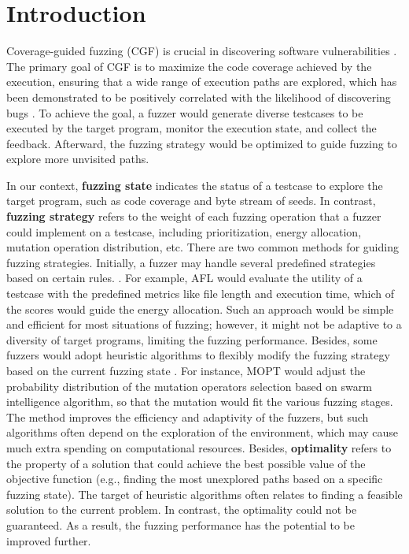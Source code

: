 \documentclass[lettersize,journal]{IEEEtran}
\begin{document}
\section{Introduction}

Coverage-guided fuzzing (CGF) is crucial in discovering software vulnerabilities \cite{zhuFuzzingSurveyRoadmap2022}. The primary goal of CGF is to maximize the code coverage achieved by the execution, ensuring that a wide range of execution paths are explored, which has been demonstrated to be positively correlated with the likelihood of discovering bugs \cite{bohmeReliabilityCoveragebasedFuzzer2022}. To achieve the goal, a fuzzer would generate diverse testcases to be executed by the target program, monitor the execution state, and collect the feedback. Afterward, the fuzzing strategy would be optimized to guide fuzzing to explore more unvisited paths.

In our context, \textbf{fuzzing state} indicates the status of a testcase to explore the target program, such as code coverage and byte stream of seeds. In contrast, \textbf{fuzzing strategy} refers to the weight of each fuzzing operation that a fuzzer could implement on a testcase, including prioritization, energy allocation, mutation operation distribution, etc. There are two common methods for guiding fuzzing strategies. Initially, a fuzzer may handle several predefined strategies based on certain rules. \cite{fioraldiAFLCombiningIncremental2020,zhuRegressionGreyboxFuzzing2021,chenNovelCoverageguidedGreybox2023}. For example, AFL \cite{AmericanFuzzyLop} would evaluate the utility of a testcase with the predefined metrics like file length and execution time, which of the scores would guide the energy allocation. Such an approach would be simple and efficient for most situations of fuzzing; however, it might not be adaptive to a diversity of target programs, limiting the fuzzing performance. Besides, some fuzzers would adopt heuristic algorithms to flexibly modify the fuzzing strategy based on the current fuzzing state \cite{yueEcoFuzzAdaptiveEnergysaving2020,wuOneFuzzingStrategy2022,jauernigDARWINSurvivalFittest2023,gaoFAFuzzNovelScheduling2024}. For instance, MOPT \cite{lyuMOPTOptimizedMutation2019} would adjust the probability distribution of the mutation operators selection based on swarm intelligence algorithm, so that the mutation would fit the various fuzzing stages. The method improves the efficiency and adaptivity of the fuzzers, but such algorithms often depend on the exploration of the environment, which may cause much extra spending on computational resources. Besides, \textbf{optimality} refers to the property of a solution that could achieve the best possible value of the objective function (e.g., finding the most unexplored paths based on a specific fuzzing state). The target of heuristic algorithms often relates to finding a feasible solution to the current problem. In contrast, the optimality could not be guaranteed. As a result, the fuzzing performance has the potential to be improved further.
\end{document}
